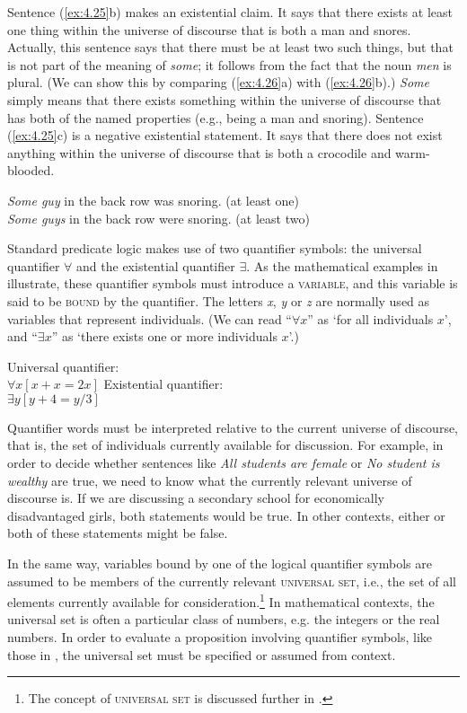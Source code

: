 Sentence (\ref{ex:4.25}b) makes an existential claim. It says that there exists at least one thing within the universe of discourse that is both a man and snores. Actually, this sentence says that there must be at least two such things, but that is not part of the meaning of \textit{some}; it follows from the fact that the noun \textit{men} is plural. (We can show this by comparing (\ref{ex:4.26}a) with (\ref{ex:4.26}b).) \textit{Some} simply means that there exists something within the universe of discourse that has both of the named properties (e.g., being a man and snoring). Sentence (\ref{ex:4.25}c) is a negative existential statement. It says that there does not exist anything within the universe of discourse that is both a crocodile and warm-blooded.


\ea \label{ex:4.26}
\ea \textit{Some guy} in the back row was snoring.  (at least one)\\
\ex \textit{Some guys} in the back row were snoring.  (at least two)
    \z
\z

Standard predicate logic makes use of two quantifier symbols: the universal quantifier ${\forall}$ and the existential quantifier ${\exists}$. As the mathematical examples in  illustrate, these quantifier symbols must introduce a \textsc{variable}, and this variable is said to be \textsc{bound} by the quantifier. The letters \textit{x}, \textit{y} or \textit{z} are normally used as variables that represent individuals. (We can read “$\forall x$” as ‘for all individuals $x$’, and “$\exists x$” as ‘there exists one or more individuals $x$’.) 

\ea \label{ex:4.27}
\ea  Universal quantifier:\\
$\forall x[x+x = 2x]$
\ex  Existential quantifier:\\
$\exists y[y+4 = y/3]$
\z \z

Quantifier words must be interpreted relative to the current universe of discourse, that is, the set of individuals currently available for discussion. For example, in order to decide whether sentences like \textit{All students are female} or \textit{No student is wealthy} are true, we need to know what the currently relevant universe of discourse is. If we are discussing a secondary school for economically disadvantaged girls, both statements would be true. In other contexts, either or both of these statements might be false.


In the same way, variables bound by one of the logical quantifier symbols are assumed to be members of the currently relevant \textsc{universal set}, i.e., the set of all elements currently available for consideration.\footnote{The concept of \textsc{universal set} is discussed further in .} In mathematical contexts, the universal set is often a particular class of numbers, e.g. the integers or the real numbers. In order to evaluate a proposition involving quantifier symbols, like those in , the universal set must be specified or assumed from context.



